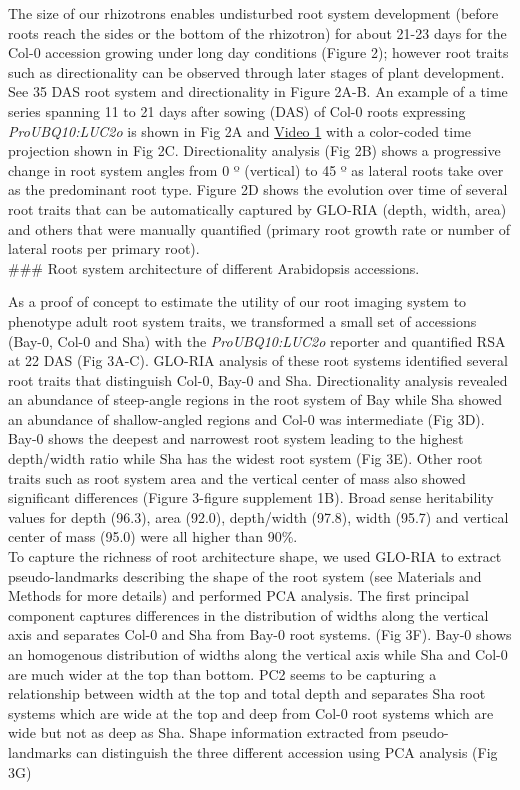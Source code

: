 \documentclass[]{article}
\begin{document}
The size of our rhizotrons enables undisturbed root system development
(before roots reach the sides or the bottom of the rhizotron) for about
21-23 days for the Col-0 accession growing under long day conditions
(Figure 2); however root traits such as directionality can be observed
through later stages of plant development. See 35 DAS root system and
directionality in Figure 2A-B. An example of a time series spanning 11
to 21 days after sowing (DAS) of Col-0 roots expressing
\emph{ProUBQ10:LUC2o} is shown in Fig 2A and
\href{https://www.dropbox.com/s/sxjc04o0yj2faif/Video_1.avi?dl=0}{Video
1} with a color-coded time projection shown in Fig 2C. Directionality
analysis (Fig 2B) shows a progressive change in root system angles from
0 º (vertical) to 45 º as lateral roots take over as the predominant
root type. Figure 2D shows the evolution over time of several root
traits that can be automatically captured by GLO-RIA (depth, width,
area) and others that were manually quantified (primary root growth rate
or number of lateral roots per primary root).\\\#\#\# Root system
architecture of different Arabidopsis accessions.

As a proof of concept to estimate the utility of our root imaging system
to phenotype adult root system traits, we transformed a small set of
accessions (Bay-0, Col-0 and Sha) with the \emph{ProUBQ10:LUC2o}
reporter and quantified RSA at 22 DAS (Fig 3A-C). GLO-RIA analysis of
these root systems identified several root traits that distinguish
Col-0, Bay-0 and Sha. Directionality analysis revealed an abundance of
steep-angle regions in the root system of Bay while Sha showed an
abundance of shallow-angled regions and Col-0 was intermediate (Fig 3D).
Bay-0 shows the deepest and narrowest root system leading to the highest
depth/width ratio while Sha has the widest root system (Fig 3E). Other
root traits such as root system area and the vertical center of mass
also showed significant differences (Figure 3-figure supplement 1B).
Broad sense heritability values for depth (96.3), area (92.0),
depth/width (97.8), width (95.7) and vertical center of mass (95.0) were
all higher than 90\%.\\ To capture the richness of root architecture
shape, we used GLO-RIA to extract pseudo-landmarks describing the shape
of the root system (see Materials and Methods for more details) and
performed PCA analysis. The first principal component captures
differences in the distribution of widths along the vertical axis and
separates Col-0 and Sha from Bay-0 root systems. (Fig 3F). Bay-0 shows
an homogenous distribution of widths along the vertical axis while Sha
and Col-0 are much wider at the top than bottom. PC2 seems to be
capturing a relationship between width at the top and total depth and
separates Sha root systems which are wide at the top and deep from Col-0
root systems which are wide but not as deep as Sha. Shape information
extracted from pseudo-landmarks can distinguish the three different
accession using PCA analysis (Fig 3G)
\end{document}
